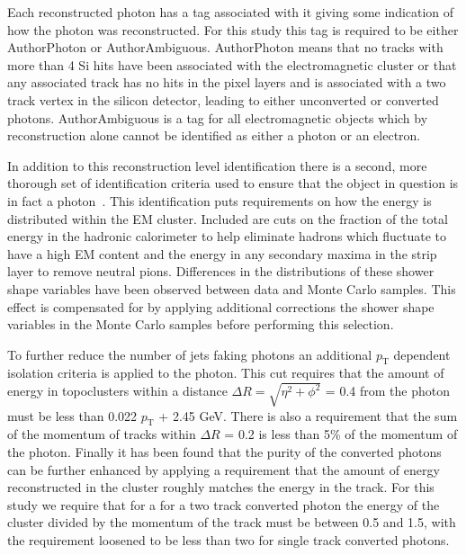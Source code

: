 Each reconstructed photon has a tag associated with it giving some indication of how the photon was reconstructed.  
For this study this tag is required to be either AuthorPhoton or AuthorAmbiguous.  
AuthorPhoton means that no tracks with more than 4 Si hits have been associated with the electromagnetic cluster or that any associated track has no hits in the pixel layers and is associated with a two track vertex in the silicon detector, leading to either unconverted or converted photons.  
AuthorAmbiguous is a tag for all electromagnetic objects which by reconstruction alone cannot be identified as either a photon or an electron.  

In addition to this reconstruction level identification there is a second, more thorough set of identification criteria used to ensure that the object in question is in fact a photon~\cite{ATL-PHYS-PUB-2016-014}.  
This identification puts requirements on how the energy is distributed within the EM cluster.  
Included are cuts on the fraction of the total energy in the hadronic calorimeter to help eliminate hadrons which fluctuate to have a high EM content and the energy in any secondary maxima in the strip layer to remove neutral pions.  
Differences in the distributions of these shower shape variables have been observed between data and Monte Carlo samples.  
This effect is compensated for by applying additional corrections the shower shape variables in the Monte Carlo samples before performing this selection.  

To further reduce the number of jets faking photons an additional $p_{\mathrm{T}}$ dependent isolation criteria is applied to the photon.  
This cut requires that the amount of energy in topoclusters within a distance $\Delta R=\sqrt{\eta^2+\phi^2}$ = 0.4 from the photon must be less than 0.022 $p_{\mathrm{T}}$ + 2.45 GeV.  
There is also a requirement that the sum of the momentum of tracks within $\Delta R$ = 0.2 is less than 5\% of the momentum of the photon.  
Finally it has been found that the purity of the converted photons can be further enhanced by applying a requirement that the amount of energy reconstructed in the cluster roughly matches the energy in the track.  
For this study we require that for a for a two track converted photon the energy of the cluster divided by the momentum of the track must be between 0.5 and 1.5, with the requirement loosened to be less than two for single track converted photons.  


